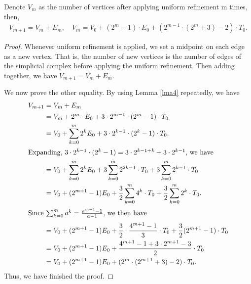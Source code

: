     \begin{lemma}
    Denote $V_{m}$ as the number of vertices after applying uniform refinement m times, then,
    \begin{align*}
    V_{m+1} = V_{m} + E_{m}, \quad V_m = V_0 + (2^m -1)\cdot E_0 + (2^{m-1}\cdot(2^m+3)-2)\cdot T_0.
    \end{align*}
    \end{lemma}
    \label{lma5}
    \begin{proof}
    Whenever uniform refinement is applied, we set a midpoint on each edge as a new vertex. That is, the number of new vertices is the number of edges of the simplicial complex before applying the uniform refinement. Then adding together, we have $V_{m+1} = V_m + E_m$.

    We now prove the other equality. By using Lemma \cref{lma4} repeatedly, we have
    \begin{align*}
    V_{m+1} &= V_m + E_m\\
    &= V_m + 2^m\cdot E_0 + 3\cdot 2^{m-1}\cdot(2^m-1)\cdot T_0\\
    &= V_0 + \sum_{k=0}^m 2^k E_0 + 3\cdot 2^{k-1}\cdot(2^k-1)\cdot T_0.\\
    \intertext{Expanding, $3\cdot 2^{k-1}\cdot(2^k-1) = 3\cdot2^{k-1+k} + 3\cdot2^{k-1}$, we have}
    &= V_0 + \sum_{k=0}^m 2^k E_0 + 3\sum_{k=0}^m 2^{2k-1}\cdot T_0 + 3\sum_{k=0}^m 2^{k-1}\cdot T_0\\
    &= V_0 + (2^{m+1}-1)E_0 + \frac{3}{2}\sum_{k=0}^m 4^k\cdot T_0 + \frac{3}{2}\sum_{k=0}^m 2^k\cdot T_0.\\
    \intertext{Since $\sum_{k=0}^m a^k = \frac{a^{m+1}-1}{a-1}$, we then have}
    &= V_0 + (2^{m+1}-1)E_0 + \frac{3}{2}\cdot\frac{4^{m+1}-1}{3}\cdot T_0 + \frac{3}{2}(2^{m+1}-1)\cdot T_0\\
    &= V_0 + (2^{m+1}-1)E_0 + \frac{4^{m+1}-1 + 3\cdot2^{m+1} -3}{2}\cdot T_0\\
    &= V_0 + (2^{m+1}-1)E_0 + (2^m\cdot(2^{m+1}+3)-2)\cdot T_0.
    \end{align*}
    Thus, we have finished the proof.
    \end{proof}



